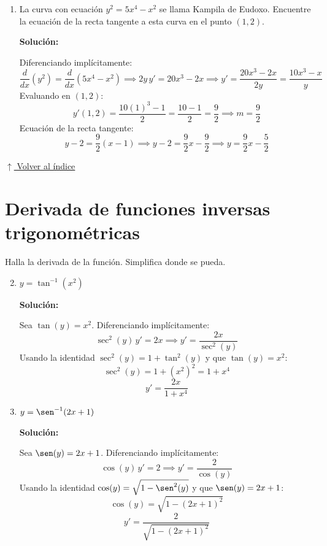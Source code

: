 \documentclass[12pt]{article}
\newcommand{\solucion}{%
    \vspace{0.8em}%
    \textbf{Solución:}%
}
\newcommand{\volverindice}{%
    \vspace{1em}%
    \begin{flushright}%
        \hyperlink{indice}{\small $\uparrow$ Volver al índice}%
    \end{flushright}%
}
\begin{document}
\begin{enumerate}[label=\alph*.-]
    \item La curva con ecuación $y^2 = 5x^4 - x^2$ se llama Kampila de Eudoxo. Encuentre la ecuación de la recta tangente a esta curva en el punto $(1, 2)$.

    \solucion

    Diferenciando implícitamente:
    \[
    \frac{d}{dx}(y^2) = \frac{d}{dx}(5x^4 - x^2)
    \implies 2y\,y' = 20x^3 - 2x
    \implies y' = \frac{20x^3 - 2x}{2y} = \frac{10x^3 - x}{y}
    \]
    Evaluando en $(1, 2)$:
    \[
    y'(1,2) = \frac{10(1)^3 - 1}{2} = \frac{10 - 1}{2} = \frac{9}{2} \implies m = \frac{9}{2}
    \]
    Ecuación de la recta tangente:
    \[
    y - 2 = \frac{9}{2}(x-1) \implies y - 2 = \frac{9}{2}x - \frac{9}{2} \implies \boxed{y = \frac{9}{2}x - \frac{5}{2}}
    \]

\end{enumerate}

\volverindice
\newpage

\section{Derivada de funciones inversas trigonométricas}
Halla la derivada de la función. Simplifica donde se pueda.

\begin{enumerate}[label=\alph*.-]
    \setcounter{enumi}{1} %
    \item $y = \tan^{-1}(x^2)$

    \solucion

    Sea $\tan(y) = x^2$. Diferenciando implícitamente:
    \[
    \sec^2(y)\,y' = 2x \implies y' = \frac{2x}{\sec^2(y)}
    \]
    Usando la identidad $\sec^2(y) = 1 + \tan^2(y)$ y que $\tan(y) = x^2$:
    \[
    \sec^2(y) = 1 + (x^2)^2 = 1 + x^4
    \]
    \[
    \boxed{y' = \frac{2x}{1+x^4}}
    \]

    \item $y = \sen^{-1}(2x+1)$

    \solucion

    Sea $\sen(y) = 2x+1$. Diferenciando implícitamente:
    \[
    \cos(y)\,y' = 2 \implies y' = \frac{2}{\cos(y)}
    \]
    Usando la identidad $\cos(y) = \sqrt{1 - \sen^2(y)}$ y que $\sen(y) = 2x+1$:
    \[
    \cos(y) = \sqrt{1-(2x+1)^2}
    \]
    \[
    \boxed{y' = \frac{2}{\sqrt{1-(2x+1)^2}}}
    \]

\end{enumerate}
\end{document}
